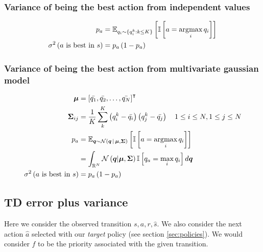\documentclass[10pt]{article}
\begin{document}
\subsubsection{Variance of being the best action from independent values}

\begin{align}
	p_a                                     & =
	\expected[q_i \sim \lbrace q^k_i : k \le K \rbrace]{\iverson{a = \argmax{i} q_i}} \\
	\func[\sigma^2]{a\text{ is best in } s} & = p_a \left(1 - p_a\right)
\end{align}

\subsubsection{Variance of being the best action from multivariate gaussian model}

\begin{align}
	\tensor{\mu}                            & = \trans{\left[ \bar{q_1}, \bar{q_2}, \ldots, \bar{q_N} \right]}                                                         \\
	\tensor{\Sigma}_{ij}                    & = \frac{1}{K}\sum_{k}^{K}\left(q^k_i -\bar{q_i}\right) \left( q^k_j -\bar{q_j}\right) \quad 1 \le i \le N, 1 \le j \le N \\
	p_a                                     & =
	\expected[{\tensor{q} \sim \func[\mathcal{N}]{\tensor{q} \cond \tensor{\mu}, \tensor{\Sigma} }}]{%
		\iverson{a = \argmax{i} q_i}}                                                                                                                                      \\
	                                        & = \int_{\mathbb{R}^N} \func[\mathcal{N}]{\tensor{q} \middle\vert \tensor{\mu}, \tensor{\Sigma} }
	\iverson{q_a = \max_{i} q_i}
	d\tensor{q}                                                                                                                                                        \\
	\func[\sigma^2]{a\text{ is best in } s} & = p_a \left(1 - p_a\right)
\end{align}

\subsection{TD error plus variance}

Here we consider the observed transition $s, a, r, \hat{s}$. We also consider
the next action $\hat{a}$ selected with our \emph{target} policy
(see section \ref{sec:policies}). We would consider $f$ to be the priority
associated with the given transition.
\end{document}
